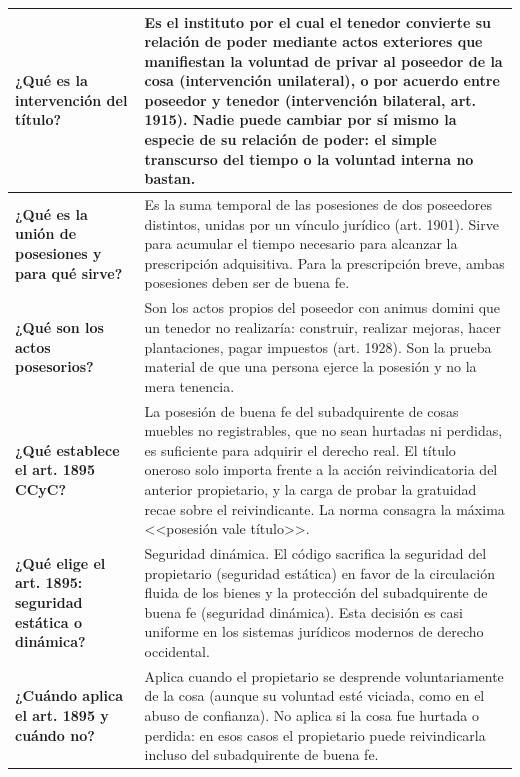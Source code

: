 \documentclass[12pt,oneside]{book}
\begin{document}
\begin{longtable}{@{}>{\raggedright\arraybackslash}p{}>{\raggedright\arraybackslash}p{}@{}}
\textbf{¿Qué es la intervención del título?} &
Es el instituto por el cual el tenedor convierte su relación de poder mediante actos exteriores que manifiestan la voluntad de privar al poseedor de la cosa (intervención unilateral), o por acuerdo entre poseedor y tenedor (intervención bilateral, art. 1915). Nadie puede cambiar por sí mismo la especie de su relación de poder: el simple transcurso del tiempo o la voluntad interna no bastan. \\
\midrule

\textbf{¿Qué es la unión de posesiones y para qué sirve?} &
Es la suma temporal de las posesiones de dos poseedores distintos, unidas por un vínculo jurídico (art. 1901). Sirve para acumular el tiempo necesario para alcanzar la prescripción adquisitiva. Para la prescripción breve, ambas posesiones deben ser de buena fe. \\
\midrule

\textbf{¿Qué son los actos posesorios?} &
Son los actos propios del poseedor con animus domini que un tenedor no realizaría: construir, realizar mejoras, hacer plantaciones, pagar impuestos (art. 1928). Son la prueba material de que una persona ejerce la posesión y no la mera tenencia. \\
\midrule

\textbf{¿Qué establece el art. 1895 CCyC?} &
La posesión de buena fe del subadquirente de cosas muebles no registrables, que no sean hurtadas ni perdidas, es suficiente para adquirir el derecho real. El título oneroso solo importa frente a la acción reivindicatoria del anterior propietario, y la carga de probar la gratuidad recae sobre el reivindicante. La norma consagra la máxima <<posesión vale título>>. \\
\midrule

\textbf{¿Qué elige el art. 1895: seguridad estática o dinámica?} &
Seguridad dinámica. El código sacrifica la seguridad del propietario (seguridad estática) en favor de la circulación fluida de los bienes y la protección del subadquirente de buena fe (seguridad dinámica). Esta decisión es casi uniforme en los sistemas jurídicos modernos de derecho occidental. \\
\midrule

\textbf{¿Cuándo aplica el art. 1895 y cuándo no?} &
Aplica cuando el propietario se desprende voluntariamente de la cosa (aunque su voluntad esté viciada, como en el abuso de confianza). No aplica si la cosa fue hurtada o perdida: en esos casos el propietario puede reivindicarla incluso del subadquirente de buena fe. \\
\midrule


\end{longtable}
\end{document}
